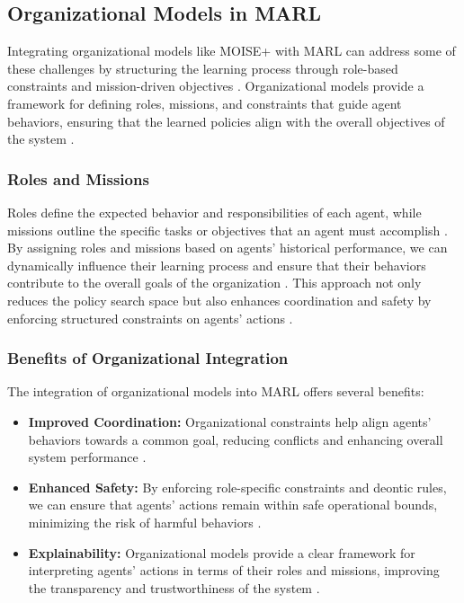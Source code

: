 \documentclass[sigconf,anonymous]{aamas}
\begin{document}

\subsection{Organizational Models in MARL}
Integrating organizational models like MOISE+ with MARL can address some of these challenges by structuring the learning process through role-based constraints and mission-driven objectives \cite{hubner2010moise, soule2024}. Organizational models provide a framework for defining roles, missions, and constraints that guide agent behaviors, ensuring that the learned policies align with the overall objectives of the system \cite{hernandez2019survey}.

\subsubsection{Roles and Missions}
Roles define the expected behavior and responsibilities of each agent, while missions outline the specific tasks or objectives that an agent must accomplish \cite{hubner2007using, castaneda2019policy}. By assigning roles and missions based on agents' historical performance, we can dynamically influence their learning process and ensure that their behaviors contribute to the overall goals of the organization \cite{hubner2010moise, soule2024}. This approach not only reduces the policy search space but also enhances coordination and safety by enforcing structured constraints on agents' actions \cite{foerster2018counterfactual}.


\subsubsection{Benefits of Organizational Integration}
The integration of organizational models into MARL offers several benefits:

\begin{itemize}
    \item \textbf{Improved Coordination:} Organizational constraints help align agents' behaviors towards a common goal, reducing conflicts and enhancing overall system performance \cite{hernandez2019survey}.
    \item \textbf{Enhanced Safety:} By enforcing role-specific constraints and deontic rules, we can ensure that agents' actions remain within safe operational bounds, minimizing the risk of harmful behaviors \cite{bastani2018verifiable}.
    \item \textbf{Explainability:} Organizational models provide a clear framework for interpreting agents' actions in terms of their roles and missions, improving the transparency and trustworthiness of the system \cite{ghosal2021explainable, su2021toward}.
\end{itemize}
\end{document}

